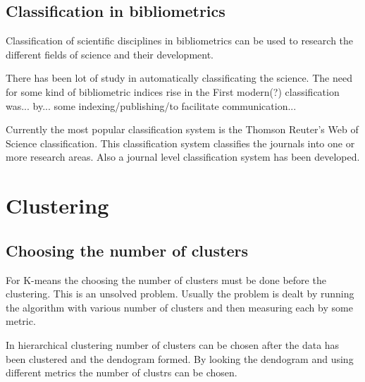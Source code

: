 \subsection{Classification in bibliometrics}
Classification of scientific disciplines in bibliometrics can be 
used to research the different fields of science and their 
development.

There has been lot of study in automatically classificating the 
science. 
The need for some kind of bibliometric indices rise in the 
First modern(?) classification was... by... some 
indexing/publishing/to facilitate communication...

%  
Currently the most popular classification system is the Thomson 
Reuter's Web of Science classification. This classification 
system classifies the journals into one or more research areas. 
\cite{waltman_new_2012} 
Also a journal level classification system has been developed.
\cite{archambault_towards_2011}

\section{Clustering}



\subsection{Choosing the number of clusters}
For K-means the choosing the number of clusters must be done before
the clustering. This is an unsolved problem. 
Usually the 
problem is dealt by running the algorithm with various number of 
clusters and then measuring each by some metric. 

In hierarchical clustering number of clusters can be chosen after 
the data has been clustered and the dendogram formed. 
 By 
looking the dendogram and using different metrics the number of 
clustrs can be chosen.


